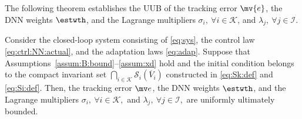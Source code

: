 \documentclass[letterpaper, journal]{IEEEtran}
\begin{document}
The following theorem establishes the UUB of the tracking error $\mv{e}$, the DNN weights $\estwth$, and the Lagrange multipliers $\sigma_i,\ \forall i \in \mathcal{K}$, and $\lambda_j,\ \forall j \in \mathcal{I}$.

\begin{theorem} \label{thm:stability}
  Consider the closed-loop system consisting of \eqref{eq:sys}, the control law \eqref{eq:ctrl:NN:actual}, and the adaptation laws \eqref{eq:adap}.
  Suppose that Assumptions~\ref{assum:B:bound}--\ref{assum:xd} hold and the initial condition belongs to the compact invariant set 
  $
  \bigcap_{i\in\mathcal K}
  \mathcal S_i(\overline V_i)
  $ 
  constructed in \eqref{eq:Sk:def} and \eqref{eq:Si:def}.
  Then, the tracking error $\mv e$, the DNN weights $\estwth$, and the Lagrange multipliers $\sigma_i,\ \forall i \in \mathcal{K},$ and $\lambda_j,\ \forall j \in \mathcal{I},$ are uniformly ultimately bounded.
\end{theorem}
\end{document}
